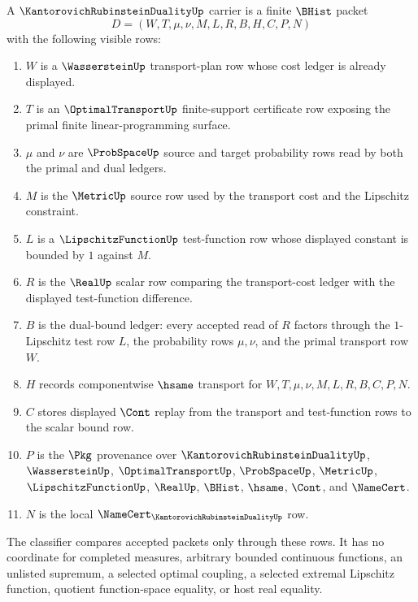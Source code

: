 \begin{definition}
\label{def:kantorovich-rubinstein-duality-carrier}
A $\KantorovichRubinsteinDualityUp$ carrier is a finite $\BHist$ packet
$$
D=(W,T,\mu,\nu,M,L,R,B,H,C,P,N)
$$
with the following visible rows:
\begin{enumerate}
\item $W$ is a $\WassersteinUp$ transport-plan row whose cost ledger is already displayed.
\item $T$ is an $\OptimalTransportUp$ finite-support certificate row exposing the primal finite linear-programming surface.
\item $\mu$ and $\nu$ are $\ProbSpaceUp$ source and target probability rows read by both the primal and dual ledgers.
\item $M$ is the $\MetricUp$ source row used by the transport cost and the Lipschitz constraint.
\item $L$ is a $\LipschitzFunctionUp$ test-function row whose displayed constant is bounded by $1$ against $M$.
\item $R$ is the $\RealUp$ scalar row comparing the transport-cost ledger with the displayed test-function difference.
\item $B$ is the dual-bound ledger: every accepted read of $R$ factors through the $1$-Lipschitz test row $L$, the probability rows $\mu,\nu$, and the primal transport row $W$.
\item $H$ records componentwise $\hsame$ transport for $W,T,\mu,\nu,M,L,R,B,C,P,N$.
\item $C$ stores displayed $\Cont$ replay from the transport and test-function rows to the scalar bound row.
\item $P$ is the $\Pkg$ provenance over $\KantorovichRubinsteinDualityUp$, $\WassersteinUp$, $\OptimalTransportUp$, $\ProbSpaceUp$, $\MetricUp$, $\LipschitzFunctionUp$, $\RealUp$, $\BHist$, $\hsame$, $\Cont$, and $\NameCert$.
\item $N$ is the local $\NameCert_{\KantorovichRubinsteinDualityUp}$ row.
\end{enumerate}
The classifier compares accepted packets only through these rows. It has no coordinate for completed measures, arbitrary bounded continuous functions, an unlisted supremum, a selected optimal coupling, a selected extremal Lipschitz function, quotient function-space equality, or host real equality.
\end{definition}

